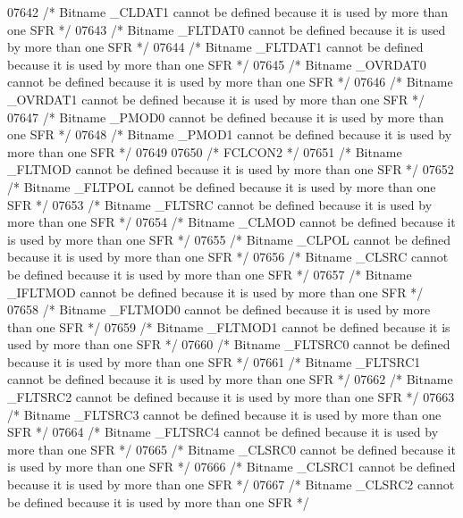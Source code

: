 \begin{DoxyCode}
07642 \textcolor{comment}{/* Bitname \_CLDAT1 cannot be defined because it is used by more than one SFR */}
07643 \textcolor{comment}{/* Bitname \_FLTDAT0 cannot be defined because it is used by more than one SFR */}
07644 \textcolor{comment}{/* Bitname \_FLTDAT1 cannot be defined because it is used by more than one SFR */}
07645 \textcolor{comment}{/* Bitname \_OVRDAT0 cannot be defined because it is used by more than one SFR */}
07646 \textcolor{comment}{/* Bitname \_OVRDAT1 cannot be defined because it is used by more than one SFR */}
07647 \textcolor{comment}{/* Bitname \_PMOD0 cannot be defined because it is used by more than one SFR */}
07648 \textcolor{comment}{/* Bitname \_PMOD1 cannot be defined because it is used by more than one SFR */}
07649 
07650 \textcolor{comment}{/* FCLCON2 */}
07651 \textcolor{comment}{/* Bitname \_FLTMOD cannot be defined because it is used by more than one SFR */}
07652 \textcolor{comment}{/* Bitname \_FLTPOL cannot be defined because it is used by more than one SFR */}
07653 \textcolor{comment}{/* Bitname \_FLTSRC cannot be defined because it is used by more than one SFR */}
07654 \textcolor{comment}{/* Bitname \_CLMOD cannot be defined because it is used by more than one SFR */}
07655 \textcolor{comment}{/* Bitname \_CLPOL cannot be defined because it is used by more than one SFR */}
07656 \textcolor{comment}{/* Bitname \_CLSRC cannot be defined because it is used by more than one SFR */}
07657 \textcolor{comment}{/* Bitname \_IFLTMOD cannot be defined because it is used by more than one SFR */}
07658 \textcolor{comment}{/* Bitname \_FLTMOD0 cannot be defined because it is used by more than one SFR */}
07659 \textcolor{comment}{/* Bitname \_FLTMOD1 cannot be defined because it is used by more than one SFR */}
07660 \textcolor{comment}{/* Bitname \_FLTSRC0 cannot be defined because it is used by more than one SFR */}
07661 \textcolor{comment}{/* Bitname \_FLTSRC1 cannot be defined because it is used by more than one SFR */}
07662 \textcolor{comment}{/* Bitname \_FLTSRC2 cannot be defined because it is used by more than one SFR */}
07663 \textcolor{comment}{/* Bitname \_FLTSRC3 cannot be defined because it is used by more than one SFR */}
07664 \textcolor{comment}{/* Bitname \_FLTSRC4 cannot be defined because it is used by more than one SFR */}
07665 \textcolor{comment}{/* Bitname \_CLSRC0 cannot be defined because it is used by more than one SFR */}
07666 \textcolor{comment}{/* Bitname \_CLSRC1 cannot be defined because it is used by more than one SFR */}
07667 \textcolor{comment}{/* Bitname \_CLSRC2 cannot be defined because it is used by more than one SFR */}

\end{DoxyCode}
